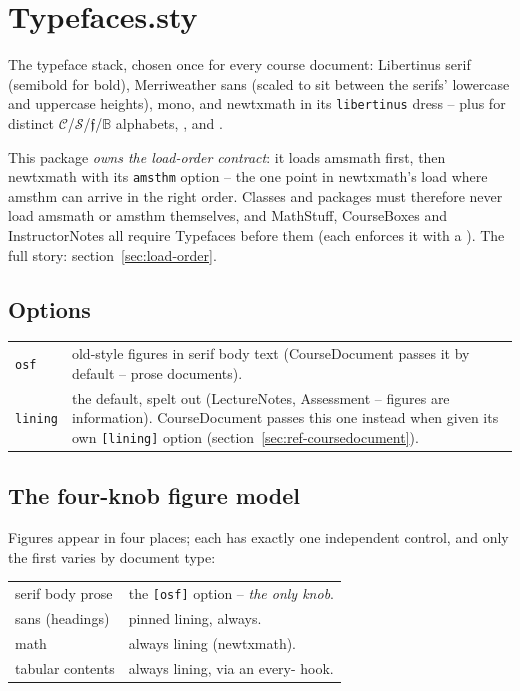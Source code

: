 \section{Typefaces.sty}\label{sec:ref-typefaces}

The typeface stack, chosen once for every course document: Libertinus
serif (semibold for bold), Merriweather sans (scaled to sit between the
serifs' lowercase and uppercase heights),  mono, and
newtxmath in its \texttt{libertinus} dress -- plus  for
distinct $\mathcal{C}$/$\mathscr{S}$/$\mathfrak{f}$/$\mathbb{B}$
alphabets, , and .

This package \emph{owns the load-order contract}: it loads amsmath first,
then newtxmath with its \texttt{amsthm} option -- the one point in
newtxmath's load where amsthm can arrive in the right order. Classes and
packages must therefore never load amsmath or amsthm themselves, and
MathStuff, CourseBoxes and InstructorNotes all require Typefaces before
them (each enforces it with a ). The full story:
section~\ref{sec:load-order}.

\subsection*{Options}

\begin{center}
\begin{tabularx}{\linewidth}{@{}l Y@{}}
\texttt{osf} & old-style figures in serif body text (CourseDocument
  passes it by default -- prose documents).\\
\texttt{lining} & the default, spelt out (LectureNotes, Assessment --
  figures are information). CourseDocument passes this one instead when
  given its own \texttt{[lining]} option
  (section~\ref{sec:ref-coursedocument}).\\
\end{tabularx}
\end{center}

\subsection*{The four-knob figure model}

Figures appear in four places; each has exactly one independent control,
and only the first varies by document type:

\begin{center}
\begin{tabularx}{\linewidth}{@{}l Y@{}}
serif body prose & the \texttt{[osf]} option -- \emph{the only knob}.\\
sans (headings) & pinned lining, always.\\
math & always lining (newtxmath).\\
tabular contents & always lining, via an every- hook.\\
\end{tabularx}
\end{center}

